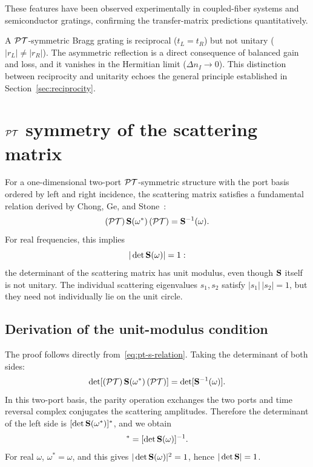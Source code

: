 These features have been observed experimentally in coupled-fiber
systems and semiconductor gratings, confirming the transfer-matrix
predictions quantitatively.

\begin{takeaway}
A $\mathcal{PT}$-symmetric Bragg grating is reciprocal ($t_L = t_R$) but not
unitary ($|r_L| \neq |r_R|$). The asymmetric reflection is a direct
consequence of balanced gain and loss, and it vanishes in the Hermitian
limit ($\Delta n_I \to 0$). This distinction between reciprocity and
unitarity echoes the general principle established in
Section~\ref{sec:reciprocity}.
\end{takeaway}


\section{$\mathcal{PT}$ symmetry of the scattering matrix}
\label{sec:pt-smatrix}

For a one-dimensional two-port $\mathcal{PT}$-symmetric structure with the port
basis ordered by left and right incidence, the scattering matrix satisfies
a
fundamental relation derived by Chong, Ge, and
Stone~\cite{chong2010symmetry}:
\begin{equation}
 (\mathcal{PT})\,\mathbf{S}(\omega^*)\,(\mathcal{PT}) = \mathbf{S}^{-1}(\omega).
 \label{eq:pt-s-relation}
\end{equation}
For real frequencies, this implies
\begin{equation}
 |\det\mathbf{S}(\omega)| = 1:
 \label{eq:det-s-unit}
\end{equation}
the determinant of the scattering matrix has unit modulus, even though
$\mathbf{S}$ itself is not unitary. The individual scattering eigenvalues
$s_1, s_2$ satisfy $|s_1|\,|s_2| = 1$, but they need not individually
lie on the unit circle.

\subsection{Derivation of the unit-modulus condition}
\label{ssec:pt-det-proof}

The proof follows directly from~\eqref{eq:pt-s-relation}. Taking the
determinant of both sides:
\begin{equation}
 \det[(\mathcal{PT})\,\mathbf{S}(\omega^*)\,(\mathcal{PT})] = \det[\mathbf{S}^{-1}(\omega)].
 \label{eq:pt-det-step1}
\end{equation}
In this two-port basis, the parity operation exchanges the two ports and
time reversal complex conjugates the scattering amplitudes. Therefore
the determinant of the left side is $[\det\mathbf{S}(\omega^*)]^*$, and we
obtain
\begin{equation}
 [\det\Smat(\omega^*)]^* = [\det\Smat(\omega)]^{-1}.
 \label{eq:pt-det-step2}
\end{equation}
For real $\omega$, $\omega^* = \omega$, and this gives
$|\det\mathbf{S}(\omega)|^2 = 1$, hence $|\det\mathbf{S}| = 1$.

